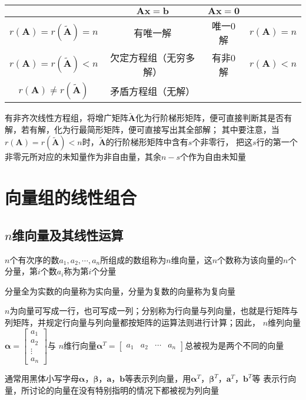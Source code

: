 \documentclass[UTF8]{ctexart}
\newcommand{\ve}[1]{{\bm{#1}}}
\newcommand{\mat}[1]{\ve{#1}}
\newcommand{\emplin}{\vspace{1em}}
\begin{document}
\emplin

\begin{center}
  \begin{tabular}{cc|cc}
    &$\mat{A}\mat{x}=\mat{b}$&$\mat{A}\mat{x}=\mat{0}$&\\
    \hline
    $r(\mat{A})=r(\widetilde{\mat{A}})=n$&有唯一解&唯一$0$解&$r(\mat{A})=n$\\
    $r(\mat{A})=r(\widetilde{\mat{A}})<n$&欠定方程组（无穷多解）&有非$0$解&$r(\mat{A})<n$\\
    $r(\mat{A})\ne r(\widetilde{\mat{A}})$&矛盾方程组（无解）
  \end{tabular}
\end{center}

有非齐次线性方程组，将增广矩阵$\widetilde{\mat{A}}$化为行阶梯形矩阵，便可直接判断其是否有解，若有解，化为行最简形矩阵，便可直接写出其全部解；
其中要注意，当$r(\mat{A})=r(\widetilde{\mat{A}})<n$时，$\widetilde{\mat{A}}$的行阶梯形矩阵中含有$s$个非零行，
把这$s$行的第一个非零元所对应的未知量作为非自由量，其余$n-s$个作为自由未知量

\section*{向量组的线性组合}
\subsection*{$n$维向量及其线性运算}
$n$个有次序的数$a_1,a_2,\cdots,a_n$所组成的数组称为$n$维向量，这$n$个数称为该向量的$n$个分量，第$i$个数$a_i$称为第$i$个分量

分量全为实数的向量称为实向量，分量为复数的向量称为复向量

$n$为向量可写成一行，也可写成一列；分别称为行向量与列向量，也就是行矩阵与列矩阵，并规定行向量与列向量都按矩阵的运算法则进行计算；因此，
$n$维列向量$\displaystyle\mat{\alpha}=\begin{bmatrix}a_1\\a_2\\\vdots\\a_n\end{bmatrix}$与
$n$维行向量$\displaystyle\mat{\alpha}^T=\begin{bmatrix}a_1&a_2&\cdots&a_n\end{bmatrix}$总被视为是两个不同的向量

通常用黑体小写字母$\mat{\alpha}$，$\mat{\beta}$，$\mat{a}$，$\mat{b}$等表示列向量，用$\mat{\alpha}^T$，$\mat{\beta}^T$，$\mat{a}^T$，$\mat{b}^T$等
表示行向量，所讨论的向量在没有特别指明的情况下都被视为列向量
\end{document}
